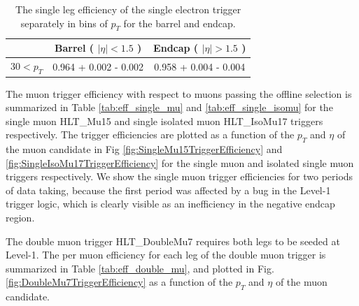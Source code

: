 \begin{table}[!ht]
\begin{center}
\begin{tabular}{c|c|c} \hline
              & Barrel ( $|\eta|<1.5$ )  & Endcap ( $|\eta|>1.5$ )  \\  \hline
\hline
30$<p_{T}$   & 0.964 + 0.002 - 0.002 & 0.958 + 0.004 - 0.004 \\
\hline
\end{tabular}
\caption{The single leg efficiency of the single electron trigger 
separately in bins of $p_{T}$ for the barrel and endcap.
\label{tab:Ele27Efficiency}}
\end{center}
\end{table}

%
%
%

The muon trigger efficiency with respect to muons passing the offline
selection is summarized in Table \ref{tab:eff_single_mu} and 
\ref{tab:eff_single_isomu} for the single muon {HLT\_Mu15} and 
single isolated muon {HLT\_IsoMu17} triggers respectively. 
The trigger efficiencies are plotted as a function of the $p_{T}$ and $\eta$ of the
muon candidate in Fig \ref{fig:SingleMu15TriggerEfficiency} and 
\ref{fig:SingleIsoMu17TriggerEfficiency} for the single muon and 
isolated single muon triggers respectively. 
We show the single muon trigger efficiencies for two periods of data taking,
because the first period was affected by a bug in the Level-1 trigger logic,
which is clearly visible as an inefficiency in the negative endcap region.

The double muon trigger {HLT\_DoubleMu7 } requires both legs to be seeded at Level-1. 
The per muon efficiency for each leg of the double muon trigger is 
summarized in Table \ref{tab:eff_double_mu}, and plotted in 
Fig. \ref{fig:DoubleMu7TriggerEfficiency} as a function of the $p_{T}$
and $\eta$ of the muon candidate.

